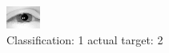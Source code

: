 \begin{figure}[h!]
\begin{center}
\includegraphics[width=0.60\columnwidth]{figures/ID2270_class_1_target_2.png}
\end{center}
\caption{ Classification: 1 actual target: 2}
\label{fig:ID2270_class_1_target_2}
\end{figure}
